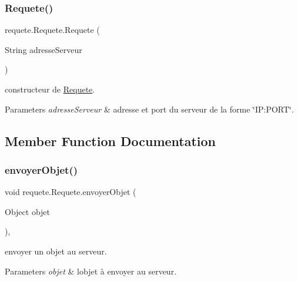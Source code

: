 \subsubsection{\texorpdfstring{Requete()}{Requete()}}
{\footnotesize\ttfamily requete.\+Requete.\+Requete (\begin{DoxyParamCaption}\item[{String}]{adresse\+Serveur }\end{DoxyParamCaption})\hspace{0.3cm}{\ttfamily [inline]}}



constructeur de \hyperlink{classrequete_1_1Requete}{Requete}. 


\begin{DoxyParams}{Parameters}
{\em adresse\+Serveur} & adresse et port du serveur de la forme \char`\"{}\+I\+P\+:\+P\+O\+R\+T\char`\"{}. \\
\hline
\end{DoxyParams}


\subsection{Member Function Documentation}
\mbox{\label{classrequete_1_1Requete_a4c463c0668c443e22d413d788b612794}} 
\subsubsection{\texorpdfstring{envoyer\+Objet()}{envoyerObjet()}}
{\footnotesize\ttfamily void requete.\+Requete.\+envoyer\+Objet (\begin{DoxyParamCaption}\item[{Object}]{objet }\end{DoxyParamCaption})\hspace{0.3cm}{\ttfamily [inline]}, {\ttfamily [protected]}}



envoyer un objet au serveur. 


\begin{DoxyParams}{Parameters}
{\em objet} & l\textquotesingle{}objet à envoyer au serveur. \\
\hline
\end{DoxyParams}
\mbox{\label{classrequete_1_1Requete_a4adc60edaa26be2f8d9b4e4b0a1377cd}} 
